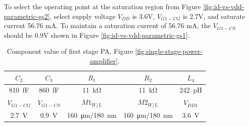 To select the operating point at the saturation region from Figure \ref{fig:id-vs-vdd-parametric-gs2}, select supply voltage $V_{DD}$ is 3.6V, $V_{G1-CG}$ is 2.7V, and saturate current 56.76 mA. To maintain a saturation current of 56.76 mA, the $V_{G1-CS}$ should be 0.9V shown in Figure \ref{fig:id-vs-vdd-parametric-gs1}.
\begin{table}[H]
  \centering
  \caption{Component value of first stage PA, Figure \ref{fig:single-stage-power-amplifier}.}
  \label{tab:component-value-of-first-stage}
  \begin{tabular}{@{}ccccc@{}}
    \toprule
    \textbf{$C_2$} & \textbf{$C_3$} & \textbf{$R_1$} & \textbf{$R_2$} & \textbf{$L_4$} \\
    \midrule
    \SI{810}{\femto\farad} & \SI{860}{\femto\farad} & \SI{11}{\kilo\ohm} & \SI{11}{\kilo\ohm} & \SI{242}{\pico\henry} \\
    \midrule
    \textbf{$V_{G1-CG}$} & \textbf{$V_{G1-CS}$} & \textbf{$M1_{W/L}$} & \textbf{$M2_{W/L}$} & \textbf{$V_{DD1}$}\\
    \midrule
     \SI{2.7}{\volt} & \SI{0.9}{\volt} & \SI{160}{\um}/\SI{180}{\nm} & \SI{160}{\um}/\SI{180}{\nm} & \SI{3.6}{\volt}\\
    \bottomrule
  \end{tabular}
\end{table}

\newpage
